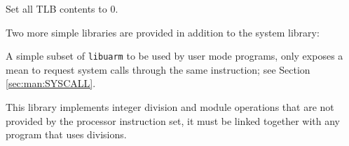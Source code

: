 
Set all TLB contents to 0.


Two more simple libraries are provided in addition to the system library:


A simple subset of \texttt{libuarm} to be used by user mode programs, only exposes a mean to request system calls through the same  instruction; see Section \ref{sec:man:SYSCALL}.


This library implements integer division and module operations that are not provided by the processor instruction set, it must be linked together with any program that uses divisions.

